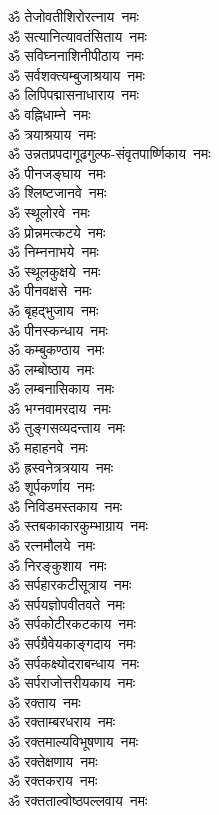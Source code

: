 \begin{multicols}{2}
\begin{flushleft}
ॐ तेजोवतीशिरोरत्नाय~नमः\\
ॐ सत्यानित्यावतंसिताय~नमः\hfill{}\\
ॐ सविघ्ननाशिनीपीठाय~नमः\\
ॐ सर्वशक्त्यम्बुजाश्रयाय~नमः\\
ॐ लिपिपद्मासनाधाराय~नमः\\
ॐ वह्निधाम्ने~नमः\\
ॐ त्रयाश्रयाय~नमः\\
ॐ उन्नतप्रपदागूढगुल्फ-संवृतपार्ष्णिकाय~नमः\\
ॐ पीनजङ्घाय~नमः\\
ॐ श्लिष्टजानवे~नमः\\
ॐ स्थूलोरवे~नमः\\
ॐ प्रोन्नमत्कटये~नमः\hfill{}\\
ॐ निम्ननाभये~नमः\\
ॐ स्थूलकुक्षये~नमः\\
ॐ पीनवक्षसे~नमः\\
ॐ बृहद्भुजाय~नमः\\
ॐ पीनस्कन्धाय~नमः\\
ॐ कम्बुकण्ठाय~नमः\\
ॐ लम्बोष्ठाय~नमः\\
ॐ लम्बनासिकाय~नमः\\
ॐ भग्नवामरदाय~नमः\\
ॐ तुङ्गसव्यदन्ताय~नमः\hfill{}\\
ॐ महाहनवे~नमः\\
ॐ ह्रस्वनेत्रत्रयाय~नमः\\
ॐ शूर्पकर्णाय~नमः\\
ॐ निविडमस्तकाय~नमः\\
ॐ स्तबकाकारकुम्भाग्राय~नमः\\
ॐ रत्नमौलये~नमः\\
ॐ निरङ्कुशाय~नमः\\
ॐ सर्पहारकटीसूत्राय~नमः\\
ॐ सर्पयज्ञोपवीतवते~नमः\\
ॐ सर्पकोटीरकटकाय~नमः\hfill{}\\
ॐ सर्पग्रैवेयकाङ्गदाय~नमः\\
ॐ सर्पकक्ष्योदराबन्धाय~नमः\\
ॐ सर्पराजोत्तरीयकाय~नमः\\
ॐ रक्ताय~नमः\\
ॐ रक्ताम्बरधराय~नमः\\
ॐ रक्तमाल्यविभूषणाय~नमः\\
ॐ रक्तेक्षणाय~नमः\\
ॐ रक्तकराय~नमः\\
ॐ रक्तताल्वोष्ठपल्लवाय~नमः\\

\end{flushleft}
\end{multicols}
